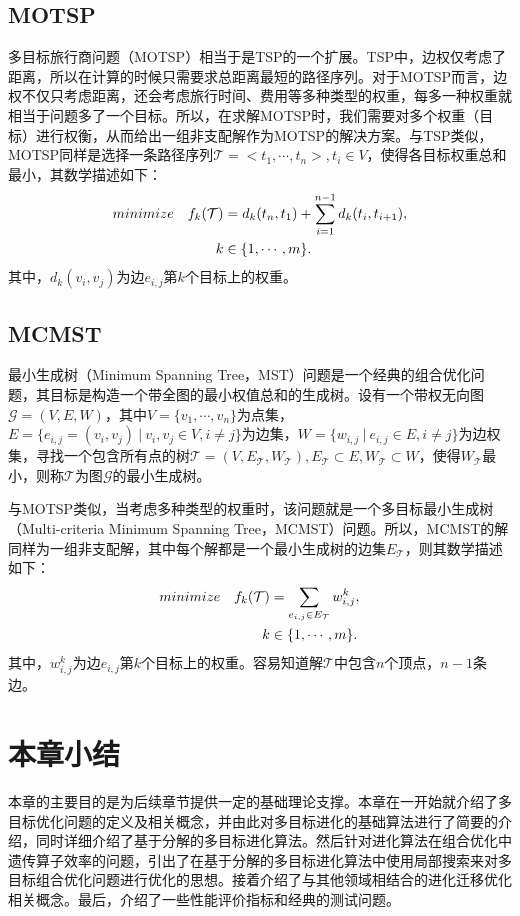 \subsection{MOTSP}
\label{subsec:背景介绍:测试问题:MOTSP}
多目标旅行商问题（MOTSP）相当于是TSP的一个扩展。TSP中，边权仅考虑了距离，所以在计算的时候只需要求总距离最短的路径序列。对于MOTSP而言，边权不仅只考虑距离，还会考虑旅行时间、费用等多种类型的权重，每多一种权重就相当于问题多了一个目标。所以，在求解MOTSP时，我们需要对多个权重（目标）进行权衡，从而给出一组非支配解作为MOTSP的解决方案。与TSP类似，MOTSP同样是选择一条路径序列$\mathcal{T} = <t_1, \cdots, t_n>, t_i \in V $，使得各目标权重总和最小，其数学描述如下：
\begin{align}
    \label{eq:MOTSP}
    minimize \quad f_k(\mathcal{T}) & = d_k(t_n,t_1) + \sum_{i=1}^{n-1} d_k(t_i,t_{i+1}), \\
    k & \in \{1, \cdots, m\}. \notag
\end{align}
其中，$d_k(v_i, v_j)$为边$e_{i,j}$第$k$个目标上的权重。

\subsection{MCMST}
\label{subsec:背景介绍:测试问题:MCMST}
最小生成树（Minimum Spanning Tree，MST）问题是一个经典的组合优化问题，其目标是构造一个带全图的最小权值总和的生成树。设有一个带权无向图$\mathcal{G}=(V,E,W)$，其中$V = \{ v_1, \cdots, v_n \}$为点集，$E = \{ e_{i,j} = (v_i,v_j) \ | \ v_i,v_j \in V, i \not = j \}$为边集，$W = \{ w_{i,j} \ | \ e_{i,j} \in E, i \not = j \}$为边权集，寻找一个包含所有点的树$\mathcal{T} = (V, E_{\mathcal{T}}, W_\mathcal{T}), E_{\mathcal{T}} \subset E,W_\mathcal{T} \subset W$，使得$W_\mathcal{T}$最小，则称$\mathcal{T}$为图$\mathcal{G}$的最小生成树。
\par
与MOTSP类似，当考虑多种类型的权重时，该问题就是一个多目标最小生成树（Multi-criteria Minimum Spanning Tree，MCMST）问题。所以，MCMST的解同样为一组非支配解，其中每个解都是一个最小生成树的边集$E_{\mathcal{T}}$，则其数学描述如下：
\begin{align}
    \label{eq:MCMST}
    minimize \quad f_k(\mathcal{T}) & = \sum_{e_{i,j} \in E_{\mathcal{T}}} w_{i,j}^k, \\
    k & \in \{1, \cdots, m\}. \notag
\end{align}
其中，$w_{i,j}^k$为边$e_{i,j}$第$k$个目标上的权重。容易知道解$\mathcal{T}$中包含$n$个顶点，$n-1$条边。

\section{本章小结}
\label{sec:背景介绍:本章小结}
本章的主要目的是为后续章节提供一定的基础理论支撑。本章在一开始就介绍了多目标优化问题的定义及相关概念，并由此对多目标进化的基础算法进行了简要的介绍，同时详细介绍了基于分解的多目标进化算法。然后针对进化算法在组合优化中遗传算子效率的问题，引出了在基于分解的多目标进化算法中使用局部搜索来对多目标组合优化问题进行优化的思想。接着介绍了与其他领域相结合的进化迁移优化相关概念。最后，介绍了一些性能评价指标和经典的测试问题。